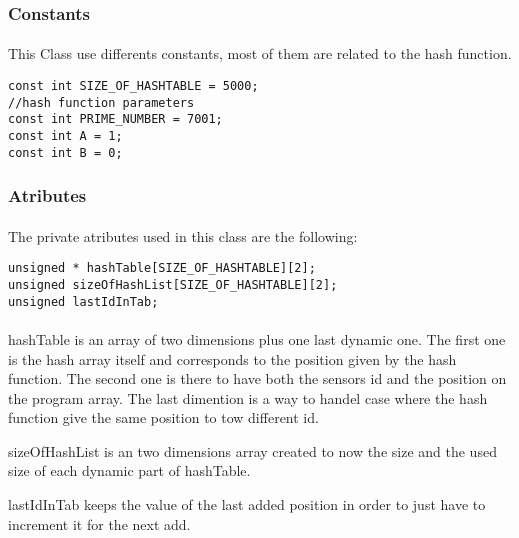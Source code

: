 \documentclass[a4paper, 12pts]{article}
\begin{document}
\subsubsection{Constants}

\paragraph{}
	This Class use differents constants, most of them are related to the hash function.

\begin{lstlisting}
const int SIZE_OF_HASHTABLE = 5000;
//hash function parameters
const int PRIME_NUMBER = 7001;
const int A = 1;
const int B = 0;
\end{lstlisting}

\subsubsection{Atributes}

\paragraph{}
	The private atributes used in this class are the following:
\begin{lstlisting}
unsigned * hashTable[SIZE_OF_HASHTABLE][2];
unsigned sizeOfHashList[SIZE_OF_HASHTABLE][2];
unsigned lastIdInTab;
\end{lstlisting}
\paragraph{}	
    hashTable is an array of two dimensions plus one last dynamic one. The first one is the hash array itself and corresponds to the position given by the hash function. The second one is there to have both the sensors id and the position on the program array. The last dimention is a way to handel case where the hash function give the same position to tow different id.
    
    sizeOfHashList is an two dimensions array created to now the size and the used size of each dynamic part of hashTable.
    
    lastIdInTab keeps the value of the last added position in order to just have to increment it for the next add.
    
\end{document}
